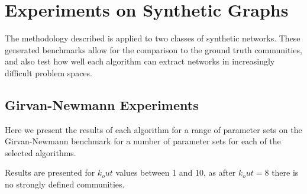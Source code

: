 \chapter{Experiments on Synthetic Graphs}

The methodology described is applied to two classes of synthetic networks. These generated benchmarks allow for the comparison to the ground truth communities, and also test how well each algorithm can extract networks in increasingly difficult problem spaces.

\section{Girvan-Newmann Experiments}
Here we present the results of each algorithm for a range of parameter sets on the Girvan-Newmann benchmark for a number of parameter sets for each of the selected algorithms.

Results are presented for $k_out$ values between 1 and 10, as after $k_out=8$ there is no strongly defined communities.







